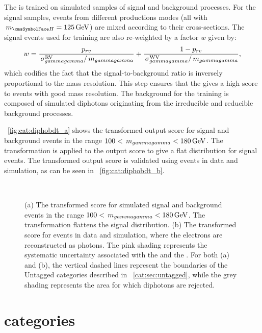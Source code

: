 The \DiPhoBdt is trained on simulated samples of signal and background processes. For the signal samples, events from different productions modes (all with $\mH=125\GeV$) are mixed according to their \SM cross-sections. The signal events used for training are also re-weighted by a factor $w$ given by: 
\begin{equation}
w= \frac{p_{rv}}{\,\sigma^\text{RV}_{gammagamma}/\,m_{gammagamma}}+\frac{1-p_{rv}}{\,\sigma^\text{WV}_{gammagamma}/\,m_{gammagamma}},
\end{equation} 
which codifies the fact that the signal-to-background ratio is inversely proportional to the mass resolution. This step ensures that the \DiPhoBdt gives a high score to events with good mass resolution.
The background for the training is composed of simulated diphotons originating from the irreducible and reducible \SM background processes. 

\Fig~\ref{fig:cat:diphobdt_a} shows the transformed \DiPhoBdt output score for signal and background events in the range $100 < \,m_{gammagamma} < 180\,\text{Ge\hspace{-.08em}V}$. The transformation is applied to the \DiPhoBdt output score to give a flat distribution for signal events. The transformed \DiPhoBdt output score is validated using \Zee events in data and simulation, as can be seen in \Fig~\ref{fig:cat:diphobdt_b}.
\begin{figure}[hpt]
\centering
\\
\caption{ (a) The transformed \DiPhoBdt score for simulated signal and background events in the range $100 < \,m_{gammagamma} < 180\,\text{Ge\hspace{-.08em}V}$. The transformation flattens the signal distribution. (b) The transformed \DiPhoBdt score for \Zee events in data and simulation, where the electrons are reconstructed as photons. The pink shading represents the systematic uncertainty associated with the \PhoIdBdt and the \PhoEnergyBdt. For both (a) and (b), the vertical dashed lines represent the boundaries of the Untagged categories described in \Sec~\ref{cat:sec:untagged}, while the grey shading represents the area for which diphotons are rejected.}
\label{fig:cat:diphobdt}
\end{figure}

\section{\VBFTag categories }
\label{cat:sec:vbftag}

